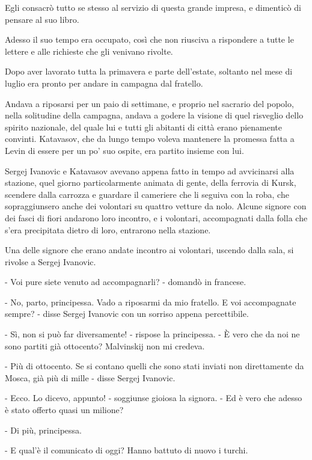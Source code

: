 Egli consacrò tutto se stesso al servizio di questa grande impresa, e dimenticò di pensare al suo libro. 

Adesso il suo tempo era occupato, così che non riusciva a rispondere a tutte le lettere e alle richieste che gli venivano rivolte. 

Dopo aver lavorato tutta la primavera e parte dell'estate, soltanto nel mese di luglio era pronto per andare in campagna dal fratello. 

Andava a riposarsi per un paio di settimane, e proprio nel sacrario del popolo, nella solitudine della campagna, andava a godere la visione di quel risveglio dello spirito nazionale, del quale lui e tutti gli abitanti di città erano pienamente convinti. Katavasov, che da lungo tempo voleva mantenere la promessa fatta a Levin di essere per un po' suo ospite, era partito insieme con lui. 

\label{ii-7} 

Sergej Ivanovic e Katavasov avevano appena fatto in tempo ad avvicinarsi alla stazione, quel giorno particolarmente animata di gente, della ferrovia di Kursk, scendere dalla carrozza e guardare il cameriere che li seguiva con la roba, che sopraggiunsero anche dei volontari su quattro vetture da nolo. Alcune signore con dei fasci di fiori andarono loro incontro, e i volontari, accompagnati dalla folla che s'era precipitata dietro di loro, entrarono nella stazione. 

Una delle signore che erano andate incontro ai volontari, uscendo dalla sala, si rivolse a Sergej Ivanovic. 

- Voi pure siete venuto ad accompagnarli? - domandò in francese. 

- No, parto, principessa. Vado a riposarmi da mio fratello. E voi accompagnate sempre? - disse Sergej Ivanovic con un sorriso appena percettibile. 

- Sì, non si può far diversamente! - rispose la principessa. - È vero che da noi ne sono partiti già ottocento? Malvinskij non mi credeva. 

- Più di ottocento. Se si contano quelli che sono stati inviati non direttamente da Mosca, già più di mille - disse Sergej Ivanovic. 

- Ecco. Lo dicevo, appunto! - soggiunse gioiosa la signora. - Ed è vero che adesso è stato offerto quasi un milione? 

- Di più, principessa. 

- E qual'è il comunicato di oggi? Hanno battuto di nuovo i turchi. 

